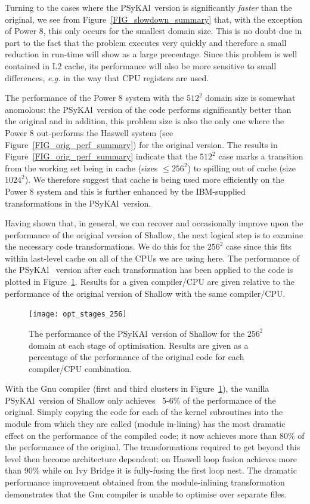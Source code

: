 \documentclass{IOS-Book-Article}
\newcommand{\psykal}{{PS}y{KA}l\ }
\begin{document}
Turning to the cases where the \psykal version is significantly
{\em faster} than the original, we see from
Figure~\ref{FIG_slowdown_summary} that, with the exception of Power 8,
this only occurs for the smallest domain size. This is no doubt due in
part to the fact that the problem executes very quickly and therefore
a small reduction in run-time will show as a large precentage. Since
this problem is well contained in L2 cache, its performance will also
be more sensitive to small differences, {\it e.g.} in the way that CPU
registers are used. 

The performance of the Power 8 system with the $512^2$ domain size is
somewhat anomolous: the \psykal version of the code performs
significantly better than the original and in addition, this problem
size is also the only one where the Power 8 out-performs the Haswell
system (see Figure~\ref{FIG_orig_perf_summary}) for the original
version.  The results in Figure~\ref{FIG_orig_perf_summary} indicate
that the $512^2$ case marks a transition from the working set being in
cache (sizes $\leq 256^2$) to spilling out of cache (size $1024^2$). We
therefore suggest that cache is being used more efficiently on the
Power 8 system and this is further enhanced by the IBM-supplied
transformations in the \psykal version.

Having shown that, in general, we can recover and occasionally improve
upon the performance of the original version of Shallow, the next
logical step is to examine the necessary code transformations.  We do
this for the $256^{2}$ case since this fits within last-level cache on
all of the CPUs we are using here.  The performance of the \psykal
version after each transformation has been applied to the code is
plotted in Figure~\ref{FIG_opt_stages_256}. Results for a given
compiler/CPU are given relative to the performance of the original
version of Shallow with the same compiler/CPU.

\begin{figure}[!t]
\centering
\texttt{[image: opt\_stages\_256]}
\caption{The performance of the \psykal version of Shallow for the
  $256^{2}$ domain at each stage of optimisation. Results are given as
  a percentage of the performance of the original code for each
  compiler/CPU combination.}
\label{FIG_opt_stages_256}
\end{figure}

With the Gnu compiler (first and third clusters in
Figure~\ref{FIG_opt_stages_256}), the vanilla \psykal version of
Shallow only achieves ~5-6\% of the performance of the
original. Simply copying the code for each of the kernel subroutines
into the module from which they are called (module in-lining) has the
most dramatic effect on the performance of the compiled code; it now
achieves more than 80\% of the performance of the original. The
transformations required to get beyond this level then become
architecture dependent: on Haswell loop fusion achieves more than 90\%
while on Ivy Bridge it is fully-fusing the first loop nest. The
dramatic performance improvement obtained from the module-inlining
transformation demonstrates that the Gnu compiler is unable to
optimise over separate files.
\end{document}
